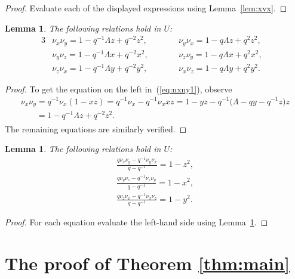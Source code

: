 \documentclass[11pt]{article}
\numberwithin{equation}{section}
\newtheorem{Lemma}[Theorem]{Lemma}
\begin{document}
\begin{proof}
Evaluate each of the displayed expressions
using
Lemma~\ref{lem:xvx}.
\end{proof}

\begin{Lemma}
\label{lem:nxny}
The following relations hold in
$U$:
\begin{alignat}{3}
& \nu_x \nu_y = 1- q^{-1}\Lambda z + q^{-2} z^2,
\qquad &&
\nu_y \nu_x = 1- q\Lambda z + q^2 z^2,&
\label{eq:nxny1}
\\
& \nu_y \nu_z = 1- q^{-1}\Lambda x + q^{-2} x^2,
\qquad &&
\nu_z \nu_y = 1- q\Lambda x + q^2 x^2,&
\label{eq:nxny2}
\\
& \nu_z \nu_x = 1- q^{-1}\Lambda y + q^{-2} y^2,
\qquad &&
\nu_x \nu_z = 1- q\Lambda y + q^2 y^2.&
\label{eq:nxny3}
\end{alignat}
\end{Lemma}

\begin{proof}
To get the equation on the left in~(\ref{eq:nxny1}), observe
\begin{gather*}
\nu_x \nu_y  =  q^{-1}\nu_x (1-xz) =q^{-1}\nu_x -q^{-1} \nu_x x z
= 1-yz -q^{-1}\big(\Lambda - qy-q^{-1}z\big)z
\\
\phantom{\nu_x \nu_y}{}  =  1-q^{-1}\Lambda z + q^{-2}z^2.
\end{gather*}
The remaining equations are similarly verif\/ied.
\end{proof}


\begin{Lemma}
\label{lem:comnxny}
The following relations hold in
$U$:
\begin{gather}
\frac{q\nu_x\nu_y - q^{-1} \nu_y \nu_x}{q-q^{-1}}  =  1-z^2,
\label{eq:c1}
\\
\frac{q\nu_y\nu_z - q^{-1} \nu_z \nu_y}{q-q^{-1}}  =  1-x^2,
\label{eq:c2}
\\
\frac{q\nu_z\nu_x - q^{-1} \nu_x \nu_z}{q-q^{-1}}  =  1-y^2.
\label{eq:c3}
\end{gather}
\end{Lemma}

\begin{proof}
 For each equation evaluate the left-hand side using
Lemma~\ref{lem:nxny}.
\end{proof}

\section{The proof of Theorem  \ref{thm:main}}\label{section4}
\end{document}
